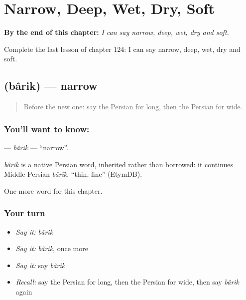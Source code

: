 
\chapter{Narrow, Deep, Wet, Dry, Soft}
\label{ch:fa-narrow-deep-wet-dry-soft}

\begin{chapteropening}
\textbf{By the end of this chapter:} \emph{I can say narrow, deep, wet, dry and soft.}

Complete the last lesson of chapter 124: I can say narrow, deep, wet, dry and soft.
\end{chapteropening}

\section[\texorpdfstring{\fa{باریک} (bârik)}{باریک (bârik)}]{ (bârik) — narrow}

\label{lesson:FA-C124-barik}



\begin{quote}
Before the new one: say the Persian for long, then the Persian for wide.
\end{quote}

\subsection*{You'll want to know: }
\textbf{} — \emph{bârik} — \textquotedblleft{}narrow\textquotedblright{}.

\begin{cousinweb}
\emph{bârik} is a native Persian word, inherited rather than borrowed: it continues Middle Persian \emph{bārīk}, \textquotedblleft{}thin, fine\textquotedblright{} (EtymDB).
\end{cousinweb}

\begin{grammarlens}[title={What you've built}]
One more word for this chapter.
\end{grammarlens}

\subsection*{Your turn}
\begin{itemize}
\raggedright
  \item \emph{Say it:} \emph{bârik}
  \item \emph{Say it:} \emph{bârik}, once more
  \item \emph{Say it:} say \emph{bârik}
  \item \emph{Recall:} say the Persian for long, then the Persian for wide, then say \emph{bârik} again
\end{itemize}


